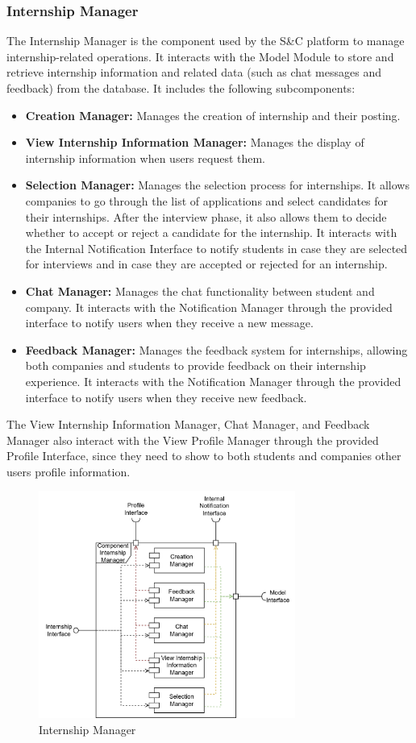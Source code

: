\subsubsection{Internship Manager}
The Internship Manager is the component used by the S\&C platform to manage internship-related operations. It interacts with the Model Module to store
and retrieve internship information and related data (such as chat messages and feedback) from the database. It includes the following subcomponents:
\begin{itemize}
    \item \textbf{Creation Manager:} Manages the creation of internship and their posting. 
    \item \textbf{View Internship Information Manager:} Manages the display of internship information when users request them.
    \item \textbf{Selection Manager:} Manages the selection process for internships. It allows companies to go through the list of applications and select 
    candidates for their internships. After the interview phase, it also allows them to decide whether to accept or reject a candidate for the internship. 
    It interacts with the Internal Notification Interface to notify students in case they are selected for interviews and in case they are accepted or rejected 
    for an internship.
    \item \textbf{Chat Manager:} Manages the chat functionality between student and company. It interacts with the Notification Manager through the provided
    interface to notify users when they receive a new message.
    \item \textbf{Feedback Manager:} Manages the feedback system for internships, allowing both companies and students to provide feedback on their internship 
    experience. It interacts with the Notification Manager through the provided interface to notify users when they receive new feedback.
\end{itemize}
The View Internship Information Manager, Chat Manager, and Feedback Manager also interact with the View Profile Manager through the provided Profile Interface,
since they need to show to both students and companies other users profile information.
\begin{figure}[H]
    \centering
    \includegraphics[width=0.75\textwidth]{Images/Components/internship_Component.png}
    \caption{Internship Manager}\label{fig:internship_manager}
\end{figure}
